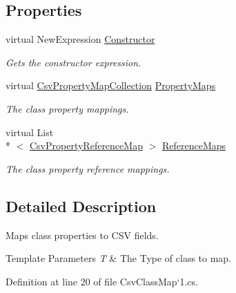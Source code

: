 \subsection*{Properties}
\begin{DoxyCompactItemize}
\item 
virtual New\-Expression \hyperlink{a00057_ae8038b36db7584ef1a73852fcc46404b}{Constructor}
\begin{DoxyCompactList}\small\item\em Gets the constructor expression. \end{DoxyCompactList}\item 
virtual \hyperlink{a00068}{Csv\-Property\-Map\-Collection} \hyperlink{a00057_a9580e897abcba144f3101eb983348e25}{Property\-Maps}
\begin{DoxyCompactList}\small\item\em The class property mappings. \end{DoxyCompactList}\item 
virtual List\\*
$<$ \hyperlink{a00072}{Csv\-Property\-Reference\-Map} $>$ \hyperlink{a00057_a6dfbf8f743b16d2ec83edef865ea2d9e}{Reference\-Maps}
\begin{DoxyCompactList}\small\item\em The class property reference mappings. \end{DoxyCompactList}\end{DoxyCompactItemize}


\subsection{Detailed Description}
Maps class properties to C\-S\-V fields. 


\begin{DoxyTemplParams}{Template Parameters}
{\em T} & The Type of class to map.\\
\hline
\end{DoxyTemplParams}


Definition at line 20 of file Csv\-Class\-Map`1.\-cs.



